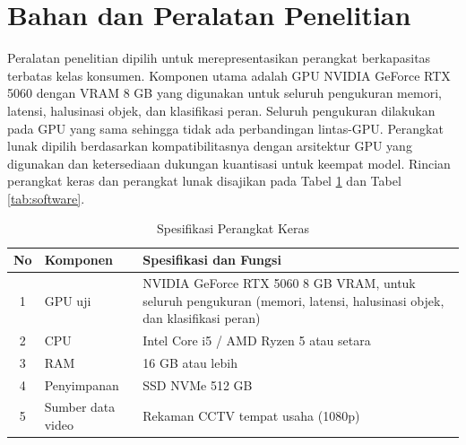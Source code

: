 \section{Bahan dan Peralatan Penelitian}
Peralatan penelitian dipilih untuk merepresentasikan perangkat berkapasitas terbatas kelas konsumen. Komponen utama adalah GPU NVIDIA GeForce RTX 5060 dengan VRAM 8 GB yang digunakan untuk seluruh pengukuran memori, latensi, halusinasi objek, dan klasifikasi peran. Seluruh pengukuran dilakukan pada GPU yang sama sehingga tidak ada perbandingan lintas-GPU. Perangkat lunak dipilih berdasarkan kompatibilitasnya dengan arsitektur GPU yang digunakan dan ketersediaan dukungan kuantisasi untuk keempat model. Rincian perangkat keras dan perangkat lunak disajikan pada Tabel \ref{tab:hardware} dan Tabel \ref{tab:software}.

\begin{table}[H]
    \centering
    \caption{Spesifikasi Perangkat Keras}
    \label{tab:hardware}
    \renewcommand{\arraystretch}{1.3}
    \begin{tabular}{|c|p{4cm}|p{8cm}|}
    \hline
    \textbf{No} & \textbf{Komponen} & \textbf{Spesifikasi dan Fungsi} \\
    \hline
    1 & GPU uji & NVIDIA GeForce RTX 5060 8 GB VRAM, untuk seluruh pengukuran (memori, latensi, halusinasi objek, dan klasifikasi peran) \\
    \hline
    2 & CPU & Intel Core i5 / AMD Ryzen 5 atau setara \\
    \hline
    3 & RAM & 16 GB atau lebih \\
    \hline
    4 & Penyimpanan & SSD NVMe 512 GB \\
    \hline
    5 & Sumber data video & Rekaman CCTV tempat usaha (1080p) \\
    \hline
    \end{tabular}
\end{table}

